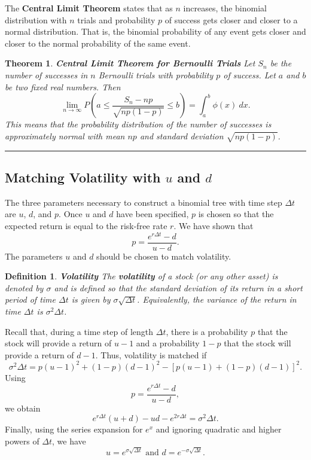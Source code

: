 \documentclass[letterpaper,10pt]{article}
\newtheorem{thm}{Theorem}
\newtheorem{df}{Definition}[section]
\begin{document}
\noindent The {\bf Central Limit Theorem} states that as $n$ increases, the binomial distribution with $n$ trials and probability $p$ of success gets closer and closer to a normal distribution. That is, the binomial probability of any event gets closer and closer to the normal probability of the same event.

\begin{thm}{\bf Central Limit Theorem for Bernoulli Trials}
Let $S_n$ be the number of successes in $n$ Bernoulli trials with probability $p$ of success.  Let $a$ and $b$ be two fixed real numbers.  Then $$\lim_{n\rightarrow\infty}P\left(a\leq \frac{S_n-np}{\sqrt{np(1-p)}}\leq b\right)=\int_a^b\phi(x)\:dx.$$  This means that the probability distribution of the number of successes is approximately normal with mean $np$ and standard deviation $\sqrt{np(1-p)}$.
\end{thm}



\bigskip

\hrule

\bigskip

\subsection{Matching Volatility with $u$ and $d$}



\noindent The three parameters necessary to construct a binomial tree with time step $\Delta t$ are $u$, $d$, and $p$.  Once $u$ and $d$ have been specified, $p$ is chosen so that the expected return is equal to the risk-free rate $r$.  We have shown that $$p=\frac{e^{r\Delta t}-d}{u-d}.$$  The parameters $u$ and $d$ should be chosen to match volatility.  

\begin{df}{\bf Volatility}
The {\bf volatility} of a stock (or any other asset) is denoted by $\sigma$ and is defined so that the standard deviation of its return in a short period of time $\Delta t$ is given by $\sigma\sqrt{\Delta t}$.  Equivalently, the variance of the return in time $\Delta t$ is $\sigma^2\Delta t$.  \end{df}

\noindent Recall that, during a time step of length $\Delta t$, there is a probability $p$ that the stock will provide a return of $u-1$ and a probability $1-p$ that the stock will provide a return of $d-1$.  Thus, volatility is matched if $$\sigma^2\Delta t=p(u-1)^2+(1-p)(d-1)^2-[p(u-1)+(1-p)(d-1)]^2.$$ Using $$p=\frac{e^{r\Delta t}-d}{u-d},$$ we obtain $$e^{r\Delta t}(u+d)-ud-e^{2r\Delta t}=\sigma^2\Delta t.$$  Finally, using the series expansion for $e^x$ and ignoring quadratic and higher powers of $\Delta t$, we have $$u=e^{\sigma\sqrt{\Delta t}}\text{ and }d=e^{-\sigma\sqrt{\Delta t}}.$$  
\end{document}
